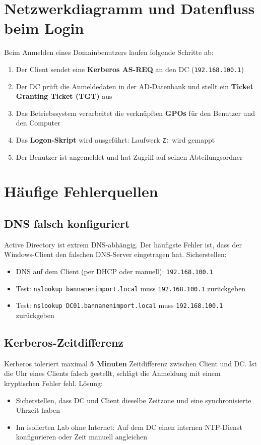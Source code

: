\documentclass[11pt, oneside, numbers=noenddot]{scrbook}
\begin{document}
\section{Netzwerkdiagramm und Datenfluss beim Login}

Beim Anmelden eines Domainbenutzers laufen folgende Schritte ab:
\begin{enumerate}
  \item Der Client sendet eine \textbf{Kerberos AS-REQ} an den DC (\texttt{192.168.100.1})
  \item Der DC prüft die Anmeldedaten in der AD-Datenbank und stellt ein \textbf{Ticket Granting Ticket (TGT)} aus
  \item Das Betriebssystem verarbeitet die verknüpften \textbf{GPOs} für den Benutzer und den Computer
  \item Das \textbf{Logon-Skript} wird ausgeführt: Laufwerk \texttt{Z:} wird gemappt
  \item Der Benutzer ist angemeldet und hat Zugriff auf seinen Abteilungsordner
\end{enumerate}

\newpage
\section{Häufige Fehlerquellen}

\subsection*{DNS falsch konfiguriert}
Active Directory ist extrem DNS-abhängig. Der häufigste Fehler ist, dass der Windows-Client den falschen DNS-Server eingetragen hat. Sicherstellen:
\begin{itemize}
  \item DNS auf dem Client (per DHCP oder manuell): \texttt{192.168.100.1}
  \item Test: \texttt{nslookup bannanenimport.local} muss \texttt{192.168.100.1} zurückgeben
  \item Test: \texttt{nslookup DC01.bannanenimport.local} muss \texttt{192.168.100.1} zurückgeben
\end{itemize}

\subsection*{Kerberos-Zeitdifferenz}
Kerberos toleriert maximal \textbf{5 Minuten} Zeitdifferenz zwischen Client und DC. Ist die Uhr eines Clients falsch gestellt, schlägt die Anmeldung mit einem kryptischen Fehler fehl. Lösung:
\begin{itemize}
  \item Sicherstellen, dass DC und Client dieselbe Zeitzone und eine synchronisierte Uhrzeit haben
  \item Im isolierten Lab ohne Internet: Auf dem DC einen internen NTP-Dienst konfigurieren oder Zeit manuell angleichen
\end{itemize}
\end{document}
